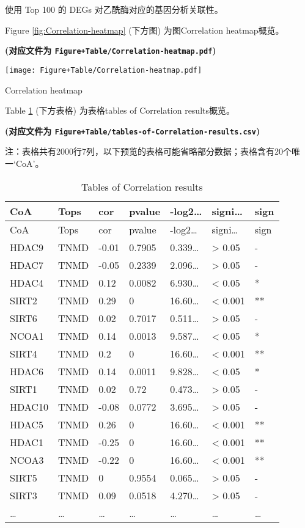 \documentclass[
]{article}
\begin{document}
使用 Top 100 的 DEGs 对乙酰酶对应的基因分析关联性。

Figure \ref{fig:Correlation-heatmap} (下方图) 为图Correlation heatmap概览。

\textbf{(对应文件为 \texttt{Figure+Table/Correlation-heatmap.pdf})}

\def\@captype{figure}
\begin{center}
\texttt{[image: Figure+Table/Correlation-heatmap.pdf]}
\caption{Correlation heatmap}\label{fig:Correlation-heatmap}
\end{center}

Table \ref{tab:tables-of-Correlation-results} (下方表格) 为表格tables of Correlation results概览。

\textbf{(对应文件为 \texttt{Figure+Table/tables-of-Correlation-results.csv})}

\begin{center}\begin{tcolorbox}[colback=gray!10, colframe=gray!50, width=0.9\linewidth, arc=1mm, boxrule=0.5pt]注：表格共有2000行7列，以下预览的表格可能省略部分数据；表格含有20个唯一`CoA'。
\end{tcolorbox}
\end{center}

\begin{longtable}[]{@{}lllllll@{}}
\caption{\label{tab:tables-of-Correlation-results}Tables of Correlation results}\tabularnewline
\toprule
CoA & Tops & cor & pvalue & -log2\ldots{} & signi\ldots{} & sign\tabularnewline
\midrule
\endfirsthead
\toprule
CoA & Tops & cor & pvalue & -log2\ldots{} & signi\ldots{} & sign\tabularnewline
\midrule
\endhead
HDAC9 & TNMD & -0.01 & 0.7905 & 0.339\ldots{} & \textgreater{} 0.05 & -\tabularnewline
HDAC7 & TNMD & -0.05 & 0.2339 & 2.096\ldots{} & \textgreater{} 0.05 & -\tabularnewline
HDAC4 & TNMD & 0.12 & 0.0082 & 6.930\ldots{} & \textless{} 0.05 & *\tabularnewline
SIRT2 & TNMD & 0.29 & 0 & 16.60\ldots{} & \textless{} 0.001 & **\tabularnewline
SIRT6 & TNMD & 0.02 & 0.7017 & 0.511\ldots{} & \textgreater{} 0.05 & -\tabularnewline
NCOA1 & TNMD & 0.14 & 0.0013 & 9.587\ldots{} & \textless{} 0.05 & *\tabularnewline
SIRT4 & TNMD & 0.2 & 0 & 16.60\ldots{} & \textless{} 0.001 & **\tabularnewline
HDAC6 & TNMD & 0.14 & 0.0011 & 9.828\ldots{} & \textless{} 0.05 & *\tabularnewline
SIRT1 & TNMD & 0.02 & 0.72 & 0.473\ldots{} & \textgreater{} 0.05 & -\tabularnewline
HDAC10 & TNMD & -0.08 & 0.0772 & 3.695\ldots{} & \textgreater{} 0.05 & -\tabularnewline
HDAC5 & TNMD & 0.26 & 0 & 16.60\ldots{} & \textless{} 0.001 & **\tabularnewline
HDAC1 & TNMD & -0.25 & 0 & 16.60\ldots{} & \textless{} 0.001 & **\tabularnewline
NCOA3 & TNMD & -0.22 & 0 & 16.60\ldots{} & \textless{} 0.001 & **\tabularnewline
SIRT5 & TNMD & 0 & 0.9554 & 0.065\ldots{} & \textgreater{} 0.05 & -\tabularnewline
SIRT3 & TNMD & 0.09 & 0.0518 & 4.270\ldots{} & \textgreater{} 0.05 & -\tabularnewline
\ldots{} & \ldots{} & \ldots{} & \ldots{} & \ldots{} & \ldots{} & \ldots{}\tabularnewline
\bottomrule
\end{longtable}
\end{document}
